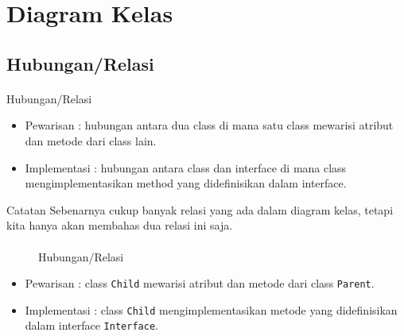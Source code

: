 \documentclass{../praktikum-ppt}
\begin{document}
    \section{Diagram Kelas}
    \subsection{Hubungan/Relasi}
    \begin{frame}{\insertsection}
      \framesubtitle{\insertsubsection}
      \begin{block}{Hubungan/Relasi}
        \begin{itemize}
          \item Pewarisan : hubungan antara dua class di mana satu class mewarisi atribut dan metode dari class lain.
          \item Implementasi : hubungan antara class dan interface di mana class mengimplementasikan method yang didefinisikan dalam interface.
        \end{itemize}
        \begin{alertblock}{Catatan}
          Sebenarnya cukup banyak relasi yang ada dalam diagram kelas, tetapi kita hanya akan membahas dua relasi ini saja.
        \end{alertblock}
      \end{block}
    \end{frame}

    \begin{frame}{\insertsection}
      \framesubtitle{\insertsubsection}
      \begin{figure}[h!]
        \centering
        \caption{Hubungan/Relasi}
      \end{figure}
      \begin{contoh}
        \begin{itemize}
          \item Pewarisan : class \texttt{Child} mewarisi atribut dan metode dari class \texttt{Parent}.
          \item Implementasi : class \texttt{Child} mengimplementasikan metode yang didefinisikan dalam interface \texttt{Interface}.
        \end{itemize}
      \end{contoh}
    \end{frame}
\end{document}
